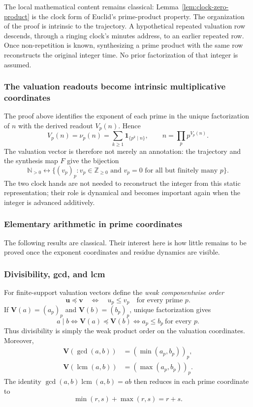 \documentclass[11pt,a4paper]{article}
\theoremstyle{clockplain}
\theoremstyle{definition}
\theoremstyle{remark}
\newcommand{\Z}{\mathbb Z}
\newcommand{\N}{\mathbb N}
\newcommand{\V}{\mathbf V}
\newcommand{\lcm}{\operatorname{lcm}}
\begin{document}
The local mathematical content remains classical: Lemma~\ref{lem:clock-zero-product} is the clock form of Euclid's prime-product property. The organization of the proof is intrinsic to the trajectory. A hypothetical repeated valuation row descends, through a ringing clock's minutes address, to an earlier repeated row. Once non-repetition is known, synthesizing a prime product with the same row reconstructs the original integer time. No prior factorization of that integer is assumed.

\subsubsection{The valuation readouts become intrinsic multiplicative coordinates}

The proof above identifies the exponent of each prime in the unique factorization of $n$ with the derived readout $V_p(n)$. Hence
\begin{equation}
\boxed{V_p(n)=\nu_p(n)=\sum_{k\ge1}\mathbf{1}_{\{p^k\mid n\}},
\qquad
n=\prod_p p^{V_p(n)}.}
\label{eq:valuation-clock-tower}
\end{equation}
The valuation vector is therefore not merely an annotation: the trajectory and the synthesis map $F$ give the bijection
\[
\N_{>0}\longleftrightarrow
\bigl\{(v_p)_p:v_p\in\Z_{\ge0}\text{ and }v_p=0\text{ for all but finitely many }p\bigr\}.
\]
The two clock hands are not needed to reconstruct the integer from this static representation; their role is dynamical and becomes important again when the integer is advanced additively.

\subsubsection{Elementary arithmetic in prime coordinates}
\label{sec:elementary}

The following results are classical.  Their interest here is how little remains to be proved once the exponent coordinates and residue dynamics are visible.

\subsubsection{Divisibility, gcd, and lcm}

For finite-support valuation vectors define the \emph{weak componentwise order}
\[
\mathbf u\preceq\mathbf v
\quad\Longleftrightarrow\quad
u_p\le v_p\quad\text{for every prime }p.
\]
If $\V(a)=(a_p)_p$ and $\V(b)=(b_p)_p$, unique factorization gives
\begin{equation}
\boxed{a\mid b\iff \V(a)\preceq\V(b)
       \iff a_p\le b_p\ \text{for every }p.}
\label{eq:divisibility}
\end{equation}
Thus divisibility is simply the weak product order on the valuation coordinates. Moreover,
\begin{align}
\V(\gcd(a,b))&=(\min(a_p,b_p))_p,\label{eq:gcdmin}\\
\V(\lcm(a,b))&=(\max(a_p,b_p))_p.\label{eq:lcmmax}
\end{align}
The identity $\gcd(a,b)\lcm(a,b)=ab$ then reduces in each prime coordinate to
\[
\min(r,s)+\max(r,s)=r+s.
\]
\end{document}
